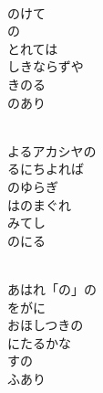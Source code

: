 \documentclass[10pt,b5j]{tarticle} %
\begin{document}
\vspace{1.5em} %
\newcommand{\linespace}{0.5em} %
\newcommand{\blocksize}{0.5\hsize} %
\newcommand{\itemmargin}{3em} %
\begin{enumerate} %
    \setlength{\itemindent}{\itemmargin} %
    \begin{minipage}[c]{\blocksize}
    
        \vspace{\linespace}
        \item~\\
        のけて\\
        の\\
        とれては\\
        しきならずや\\
        きのる\\
        のあり
        
    \end{minipage}
    \begin{minipage}[c]{\blocksize}
        
        \vspace{\linespace}
        \item~\\
        よるアカシヤの\\
        るにちよれば\\
        のゆらぎ\\
        はのまぐれ\\
        みてし\\
        のにる
        
    \end{minipage}
    \begin{minipage}[c]{\blocksize}
        
        \vspace{\linespace}
        \item~\\
        あはれ「の」の\\
        をがに\\
        おほしつきの\\
        にたるかな\\
        すの\\
        ふあり
        

\end{minipage}
\end{enumerate}
\end{document}
